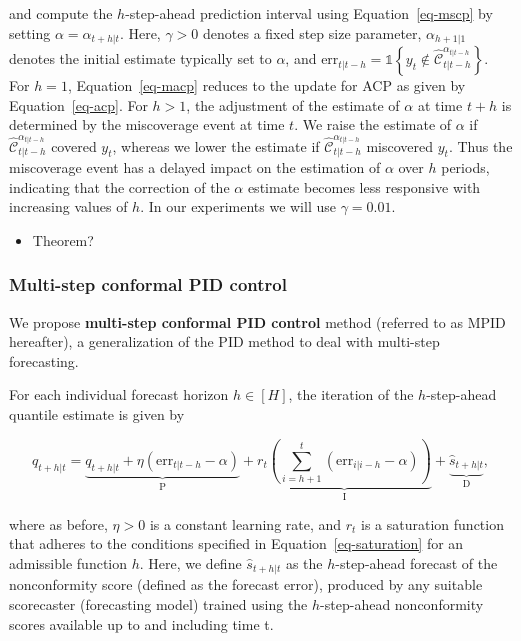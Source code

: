 \documentclass[
  11pt,
  a4paper,
]{article}
\providecommand{\tightlist}{%
  \setlength{\itemsep}{0pt}\setlength{\parskip}{0pt}}\usepackage{longtable,booktabs,array}
\theoremstyle{plain}
\theoremstyle{plain}
\theoremstyle{remark}
\begin{document}
and compute the \(h\)-step-ahead prediction interval using
Equation~\ref{eq-mscp} by setting \(\alpha = \alpha_{t+h|t}\). Here,
\(\gamma > 0\) denotes a fixed step size parameter, \(\alpha_{h+1|1}\)
denotes the initial estimate typically set to \(\alpha\), and
\(\mathrm{err}_{t|t-h} = \mathbb{1}\left\{y_t \notin \hat{\mathcal{C}}_{t|t-h}^{\alpha_{t|t-h}}\right\}\).
For \(h=1\), Equation~\ref{eq-macp} reduces to the update for ACP as
given by Equation~\ref{eq-acp}. For \(h>1\), the adjustment of the
estimate of \(\alpha\) at time \(t+h\) is determined by the miscoverage
event at time \(t\). We raise the estimate of \(\alpha\) if
\(\hat{\mathcal{C}}_{t|t-h}^{\alpha_{t|t-h}}\) covered \(y_t\), whereas
we lower the estimate if \(\hat{\mathcal{C}}_{t|t-h}^{\alpha_{t|t-h}}\)
miscovered \(y_t\). Thus the miscoverage event has a delayed impact on
the estimation of \(\alpha\) over \(h\) periods, indicating that the
correction of the \(\alpha\) estimate becomes less responsive with
increasing values of \(h\). In our experiments we will use
\(\gamma=0.01\).

\begin{itemize}
\tightlist
\item
  Theorem?
\end{itemize}

\subsubsection{Multi-step conformal PID
control}\label{multi-step-conformal-pid-control}

We propose \textbf{multi-step conformal PID control} method (referred to
as MPID hereafter), a generalization of the PID method to deal with
multi-step forecasting.

For each individual forecast horizon \(h\in[H]\), the iteration of the
\(h\)-step-ahead quantile estimate is given by

\[
q_{t+h|t}=\underbrace{q_{t+h|t}+\eta \left(\mathrm{err}_{t|t-h}-\alpha\right)}_{\mathrm{P}}+\underbrace{r_t\left(\sum_{i=h+1}^t \left(\mathrm{err}_{i|i-h}-\alpha\right)\right)}_{\mathrm{I}}+\underbrace{\hat{s}_{t+h|t}}_{\mathrm{D}},
\]

where as before, \(\eta > 0\) is a constant learning rate, and \(r_t\)
is a saturation function that adheres to the conditions specified in
Equation~\ref{eq-saturation} for an admissible function \(h\). Here, we
define \(\hat{s}_{t+h|t}\) as the \(h\)-step-ahead forecast of the
nonconformity score (defined as the forecast error), produced by any
suitable scorecaster (forecasting model) trained using the
\(h\)-step-ahead nonconformity scores available up to and including time
t.
\end{document}
